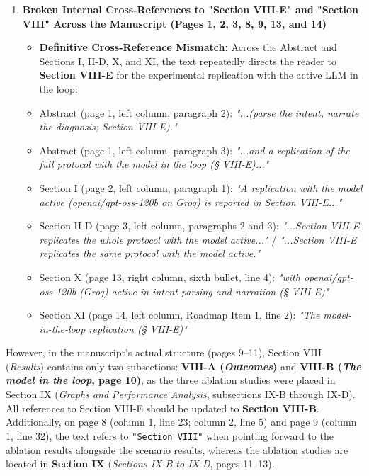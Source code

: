 \documentclass[11pt,a4paper]{article}
\begin{document}
\begin{enumerate}[leftmargin=1.6em,itemsep=3pt]
\item \textbf{Broken Internal Cross-References to "Section VIII-E" and "Section VIII" Across the Manuscript (Pages 1, 2, 3, 8, 9, 13, and 14)}
\begin{itemize}[leftmargin=1.8em,itemsep=2pt]
\item \textbf{Definitive Cross-Reference Mismatch:} Across the Abstract and Sections I, II-D, X, and XI, the text repeatedly directs the reader to \textbf{Section VIII-E} for the experimental replication with the active LLM in the loop:
\item Abstract (page 1, left column, paragraph 2): \emph{"...(parse the intent, narrate the diagnosis; Section VIII-E)."}
\item Abstract (page 1, left column, paragraph 3): \emph{"...and a replication of the full protocol with the model in the loop (§ VIII-E)..."}
\item Section I (page 2, left column, paragraph 1): \emph{"A replication with the model active (openai/gpt-oss-120b on Groq) is reported in Section VIII-E..."}
\item Section II-D (page 3, left column, paragraphs 2 and 3): \emph{"...Section VIII-E replicates the whole protocol with the model active..."} / \emph{"...Section VIII-E replicates the same protocol with the model active."}
\item Section X (page 13, right column, sixth bullet, line 4): \emph{"with openai/gpt-oss-120b (Groq) active in intent parsing and narration (§ VIII-E)"}
\item Section XI (page 14, left column, Roadmap Item 1, line 2): \emph{"The model-in-the-loop replication (§ VIII-E)"}
\end{itemize}
\end{enumerate}
However, in the manuscript's actual structure (pages 9–11), Section VIII (\emph{Results}) contains only two subsections: \textbf{VIII-A (\emph{Outcomes})} and \textbf{VIII-B (\emph{The model in the loop}, page 10)}, as the three ablation studies were placed in Section IX (\emph{Graphs and Performance Analysis}, subsections IX-B through IX-D). All references to Section VIII-E should be updated to \textbf{Section VIII-B}. Additionally, on page 8 (column 1, line 23; column 2, line 5) and page 9 (column 1, line 32), the text refers to \texttt{"Section VIII"} when pointing forward to the ablation results alongside the scenario results, whereas the ablation studies are located in \textbf{Section IX} (\emph{Sections IX-B to IX-D}, pages 11–13).
\end{document}
